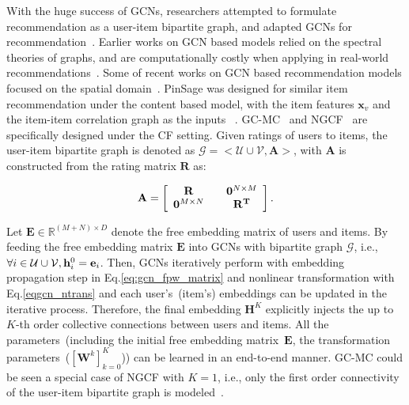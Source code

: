 \documentclass[letterpaper]{article} %
\newcommand{\Mat}[1]{\mathbf{#1}}
\begin{document}
With the huge success of GCNs, researchers attempted to formulate recommendation as a user-item bipartite graph, and adapted GCNs for recommendation~\cite{sigir2019ngcf,NIPSi2017geometric,kdd2018Pinsage}. Earlier works on GCN based models relied on the spectral theories of graphs, and are computationally costly when applying in real-world recommendations~\cite{NIPSi2017geometric,zheng2018spectral}. Some of recent works on GCN based recommendation models focused on the spatial domain~\cite{kdir18,sigir2019ngcf,kdd2018GCMC,kdd2018Pinsage}. PinSage was designed for similar item recommendation under the content based model, with the item features $\mathbf{x}_v$ and the item-item correlation graph as the inputs~\cite{kdd2018Pinsage} . GC-MC~\cite{kdd2018GCMC} and NGCF~\cite{sigir2019ngcf} are specifically designed under the CF setting. Given ratings of users to items, the user-item bipartite graph is denoted as
{\small$\mathcal{G}\!=\!<\mathcal{U}\cup \mathcal{V}, \mathbf{A}>$}, with {\small$\mathbf{A}$} is constructed from the rating matrix {\small$\Mat{R}$} as:

\begin{small}
\vspace{-0.2cm}
\begin{equation} \label{eq:cfmat2graph}
\mathbf{A}=\left [
    \begin{array}{c c}\Mat{R} \quad& \Mat{0}^{N\times M} \\
    \Mat{0}^{M\times N}\quad&\Mat{R^T} 	
    \end{array}
    \right].
\end{equation} 
\end{small}



Let {\small$\Mat{E}\in\mathbb{R}^{(M+N)\times D}$} denote the free embedding matrix of users and items. By feeding the free embedding matrix  {\small$\Mat{E}$} into GCNs with bipartite graph $\mathcal{G}$, i.e., $\small{\forall i\in \mathcal{U}\cup \mathcal{V}}, \mathbf{h}^0_i=\mathbf{e}_i$. Then, GCNs iteratively perform with embedding propagation step in Eq.\eqref{eq:gcn_fpw_matrix} and nonlinear transformation with Eq.\eqref{eqgcn_ntrans} and each user's~(item's) embeddings can be updated in the iterative process. Therefore, the final embedding {\footnotesize $\Mat{H}^K$} explicitly injects the up to $K$-th order collective connections between users and items.
All the parameters~(including the initial free embedding matrix~{\small$\Mat{E}$}, the transformation parameters~({\small $[\Mat{W}^k]_{k=0}^K$})) can be learned in an end-to-end manner. GC-MC could be seen a special case of NGCF with $K=1$, i.e., only the first order connectivity of the user-item bipartite graph is modeled~\cite{kdd2018GCMC}.
\end{document}
